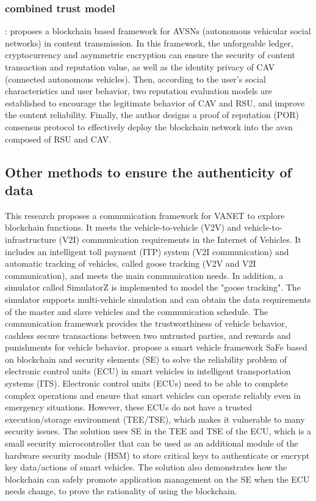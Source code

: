 \subsubsection{\bf combined trust model}:
\cite{ref43} proposes a blockchain based framework for AVSNs (autonomous vehicular social networks) in content transmission. In this framework, the unforgeable ledger, cryptocurrency and asymmetric encryption can ensure the security of content transaction and reputation value, as well as the identity privacy of CAV (connected autonomous vehicles). Then, according to the user's social characteristics and user behavior, two reputation evaluation models are established to encourage the legitimate behavior of CAV and RSU, and improve the content reliability. Finally, the author designs a proof of reputation (POR) consensus protocol to effectively deploy the blockchain network into the avsn composed of RSU and CAV.

\subsection{Other methods to ensure the authenticity of data}
\cite{ref29} This research proposes a communication framework for VANET to explore blockchain functions. It meets the vehicle-to-vehicle (V2V) and vehicle-to-infrastructure (V2I) communication requirements in the Internet of Vehicles. It includes an intelligent toll payment (ITP) system (V2I communication) and automatic tracking of vehicles, called goose tracking (V2V and V2I communication), and meets the main communication needs. In addition, a simulator called SimulatorZ is implemented to model the "goose tracking". The simulator supports multi-vehicle simulation and can obtain the data requirements of the master and slave vehicles and the communication schedule. The communication framework provides the trustworthiness of vehicle behavior, cashless secure transactions between two untrusted parties, and rewards and punishments for vehicle behavior. 
\cite{ref68} propose a smart vehicle framework SaFe based on blockchain and security elements (SE) to solve the reliability problem of electronic control units (ECU) in smart vehicles in intelligent transportation systems (ITS). Electronic control units (ECUs) need to be able to complete complex operations and ensure that smart vehicles can operate reliably even in emergency situations. However, these ECUs do not have a trusted execution/storage environment (TEE/TSE), which makes it vulnerable to many security issues. The solution uses SE in the TEE and TSE of the ECU, which is a small security microcontroller that can be used as an additional module of the hardware security module (HSM) to store critical keys to authenticate or encrypt key data/actions of smart vehicles. The solution also demonstrates how the blockchain can safely promote application management on the SE when the ECU needs change, to prove the rationality of using the blockchain.



